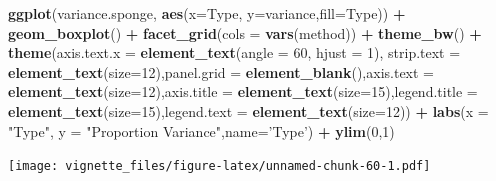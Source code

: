 \documentclass[]{book}
\newenvironment{Shaded}{\begin{snugshade}}{\end{snugshade}}
\newcommand{\KeywordTok}[1]{\textcolor[rgb]{0.13,0.29,0.53}{\textbf{#1}}}
\newcommand{\DataTypeTok}[1]{\textcolor[rgb]{0.13,0.29,0.53}{#1}}
\newcommand{\DecValTok}[1]{\textcolor[rgb]{0.00,0.00,0.81}{#1}}
\newcommand{\StringTok}[1]{\textcolor[rgb]{0.31,0.60,0.02}{#1}}
\newcommand{\OperatorTok}[1]{\textcolor[rgb]{0.81,0.36,0.00}{\textbf{#1}}}
\newcommand{\NormalTok}[1]{#1}
\begin{document}
\begin{Shaded}
\begin{Highlighting}[]
\KeywordTok{ggplot}\NormalTok{(variance.sponge, }\KeywordTok{aes}\NormalTok{(}\DataTypeTok{x=}\NormalTok{Type, }\DataTypeTok{y=}\NormalTok{variance,}\DataTypeTok{fill=}\NormalTok{Type)) }\OperatorTok{+}\StringTok{ }\KeywordTok{geom_boxplot}\NormalTok{() }\OperatorTok{+}\StringTok{ }\KeywordTok{facet_grid}\NormalTok{(}\DataTypeTok{cols =} \KeywordTok{vars}\NormalTok{(method)) }\OperatorTok{+}\StringTok{ }\KeywordTok{theme_bw}\NormalTok{() }\OperatorTok{+}\StringTok{ }\KeywordTok{theme}\NormalTok{(}\DataTypeTok{axis.text.x =} \KeywordTok{element_text}\NormalTok{(}\DataTypeTok{angle =} \DecValTok{60}\NormalTok{, }\DataTypeTok{hjust =} \DecValTok{1}\NormalTok{), }\DataTypeTok{strip.text =} \KeywordTok{element_text}\NormalTok{(}\DataTypeTok{size=}\DecValTok{12}\NormalTok{),}\DataTypeTok{panel.grid =} \KeywordTok{element_blank}\NormalTok{(),}\DataTypeTok{axis.text =} \KeywordTok{element_text}\NormalTok{(}\DataTypeTok{size=}\DecValTok{12}\NormalTok{),}\DataTypeTok{axis.title =} \KeywordTok{element_text}\NormalTok{(}\DataTypeTok{size=}\DecValTok{15}\NormalTok{),}\DataTypeTok{legend.title =} \KeywordTok{element_text}\NormalTok{(}\DataTypeTok{size=}\DecValTok{15}\NormalTok{),}\DataTypeTok{legend.text =} \KeywordTok{element_text}\NormalTok{(}\DataTypeTok{size=}\DecValTok{12}\NormalTok{)) }\OperatorTok{+}\StringTok{ }\KeywordTok{labs}\NormalTok{(}\DataTypeTok{x =} \StringTok{"Type"}\NormalTok{, }\DataTypeTok{y =} \StringTok{"Proportion Variance"}\NormalTok{,}\DataTypeTok{name=}\StringTok{'Type'}\NormalTok{) }\OperatorTok{+}\StringTok{ }\KeywordTok{ylim}\NormalTok{(}\DecValTok{0}\NormalTok{,}\DecValTok{1}\NormalTok{)}
\end{Highlighting}
\end{Shaded}

\texttt{[image: vignette\_files/figure-latex/unnamed-chunk-60-1.pdf]}
\end{document}
